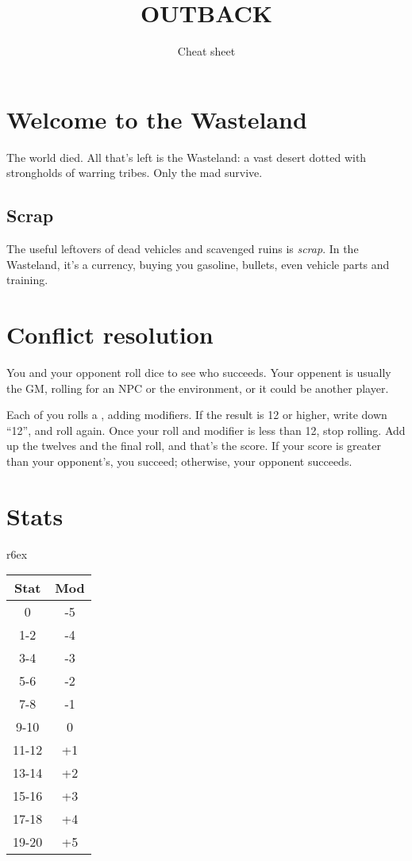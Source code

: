 \documentclass[10pt, a4paper, twocolumn]{article}
\title{\uppercase{Outback}}
\date{}
\begin{document}
\subtitle{Cheat sheet}
\compacttitle

\section{Welcome to the Wasteland}
The world died. All that's left is the Wasteland: a vast desert dotted with strongholds of warring tribes. Only the mad survive.

\subsection{Scrap}
The useful leftovers of dead vehicles and scavenged ruins is \emph{scrap}. In the Wasteland, it's a currency, buying you gasoline, bullets, even vehicle parts and training.

\section{Conflict resolution}
You and your opponent roll dice to see who succeeds. Your oppenent is usually the GM, rolling for an NPC or the environment, or it could be another player.

Each of you rolls a , adding modifiers. If the result is 12 or higher, write down ``12'', and roll again. Once your roll and modifier is less than 12, stop rolling. Add up the twelves and the final roll, and that's the score. If your score is greater than your opponent's, you succeed; otherwise, your opponent succeeds.

\section{Stats}
\begin{wraptable}[9]{r}{6ex}
  \small
\vspace*{-4ex}
\hspace*{-4.5ex}
\begin{tabular}{cc}
  Stat  & Mod \\
  \hline
  0     & -5       \\
  1-2   & -4       \\
  3-4   & -3       \\
  5-6   & -2       \\
  7-8   & -1       \\
  9-10  &  0       \\
  11-12 & +1       \\
  13-14 & +2       \\
  15-16 & +3       \\
  17-18 & +4       \\
  19-20 & +5
\end{tabular}
\end{wraptable}
\end{document}
